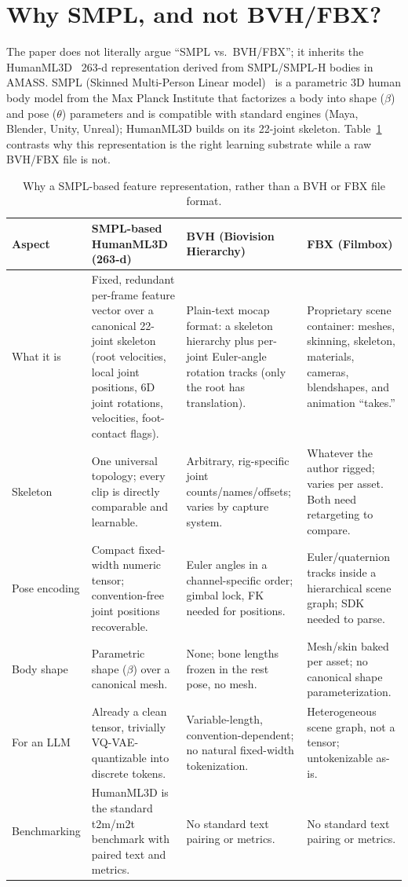 \documentclass[10pt,twocolumn]{article}
\begin{document}
\section{Why SMPL, and not BVH/FBX?}
The paper does not literally argue ``SMPL vs.\ BVH/FBX''; it inherits the HumanML3D~\cite{humanml3d}
263-d representation derived from SMPL/SMPL-H bodies in AMASS. SMPL (Skinned Multi-Person Linear
model)~\cite{smpl} is a parametric 3D human body model from the Max Planck Institute that
factorizes a body into shape ($\beta$) and pose ($\theta$) parameters and is compatible with
standard engines (Maya, Blender, Unity, Unreal); HumanML3D builds on its 22-joint skeleton.
Table~\ref{tab:smpl} contrasts why this representation is the right learning substrate while a raw
BVH/FBX file is not.

\begin{table}[t]
\centering\footnotesize
\renewcommand{\arraystretch}{1.3}
\caption{Why a SMPL-based feature representation, rather than a BVH or FBX file format.}
\label{tab:smpl}
\begin{tabularx}{\textwidth}{@{}l X X X@{}}
\toprule
\textbf{Aspect} & \textbf{SMPL-based HumanML3D (263-d)} & \textbf{BVH (Biovision Hierarchy)} & \textbf{FBX (Filmbox)} \\
\midrule
What it is & Fixed, redundant per-frame feature vector over a canonical 22-joint skeleton (root
velocities, local joint positions, 6D joint rotations, velocities, foot-contact flags). &
Plain-text mocap format: a skeleton hierarchy plus per-joint Euler-angle rotation tracks (only the
root has translation). & Proprietary scene container: meshes, skinning, skeleton, materials,
cameras, blendshapes, and animation ``takes.'' \\
Skeleton & One universal topology; every clip is directly comparable and learnable. &
Arbitrary, rig-specific joint counts/names/offsets; varies by capture system. & Whatever the author
rigged; varies per asset. Both need retargeting to compare. \\
Pose encoding & Compact fixed-width numeric tensor; convention-free joint positions recoverable. &
Euler angles in a channel-specific order; gimbal lock, FK needed for positions. & Euler/quaternion
tracks inside a hierarchical scene graph; SDK needed to parse. \\
Body shape & Parametric shape ($\beta$) over a canonical mesh. & None; bone lengths frozen in the
rest pose, no mesh. & Mesh/skin baked per asset; no canonical shape parameterization. \\
For an LLM & Already a clean tensor, trivially VQ-VAE-quantizable into discrete tokens. &
Variable-length, convention-dependent; no natural fixed-width tokenization. & Heterogeneous scene
graph, not a tensor; untokenizable as-is. \\
Benchmarking & HumanML3D is the standard t2m/m2t benchmark with paired text and metrics. &
No standard text pairing or metrics. & No standard text pairing or metrics. \\
\bottomrule
\end{tabularx}
\end{table}
\end{document}
